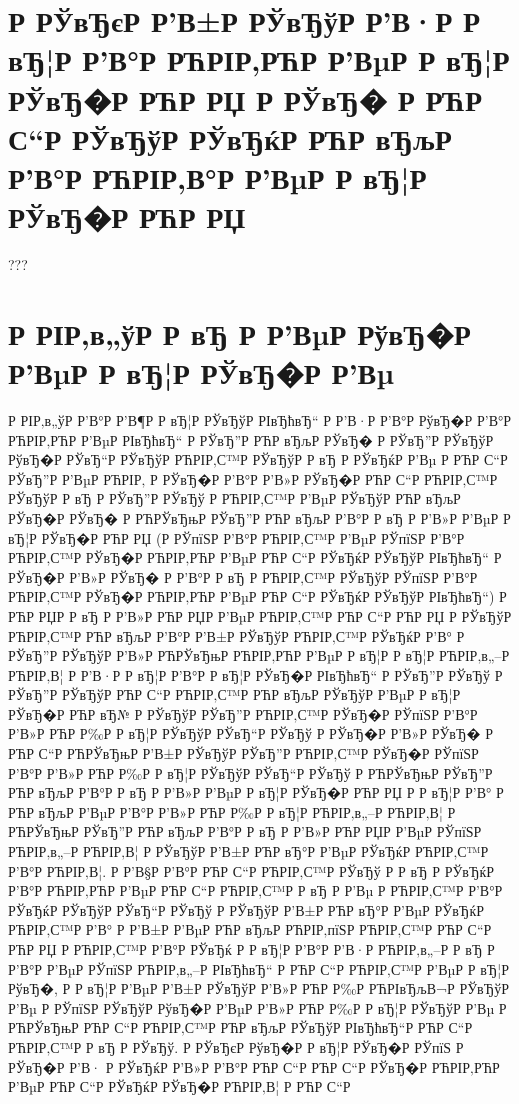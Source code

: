 \documentclass[a4paper,14pt]{extarticle}
\begin{document}
\newpage

\setcounter{page}{2}

\tableofcontents

\clearpage
\section{Р  РЎвЂєР  Р’В±Р  РЎвЂўР  Р’В·Р  Р вЂ¦Р  Р’В°Р РЋРІР‚РЋР  Р’ВµР  Р вЂ¦Р  РЎвЂ�Р РЋР РЏ Р  РЎвЂ� Р РЋР С“Р  РЎвЂўР  РЎвЂќР РЋР вЂљР  Р’В°Р РЋРІР‚В°Р  Р’ВµР  Р вЂ¦Р  РЎвЂ�Р РЋР РЏ}
	???
\clearpage

\section{Р  РІР‚в„ўР  Р вЂ Р  Р’ВµР  РўвЂ�Р  Р’ВµР  Р вЂ¦Р  РЎвЂ�Р  Р’Вµ}
Р  РІР‚в„ўР  Р’В°Р  Р’В¶Р  Р вЂ¦Р  РЎвЂўР  РІвЂћвЂ“ Р  Р’В·Р  Р’В°Р  РўвЂ�Р  Р’В°Р РЋРІР‚РЋР  Р’ВµР  РІвЂћвЂ“ Р  РЎвЂ”Р РЋР вЂљР  РЎвЂ� Р  РЎвЂ”Р  РЎвЂўР  РўвЂ�Р  РЎвЂ“Р  РЎвЂўР РЋРІР‚С™Р  РЎвЂўР  Р вЂ Р  РЎвЂќР  Р’Вµ Р РЋР С“Р  РЎвЂ”Р  Р’ВµР РЋРІР‚ Р  РЎвЂ�Р  Р’В°Р  Р’В»Р  РЎвЂ�Р РЋР С“Р РЋРІР‚С™Р  РЎвЂўР  Р вЂ  Р  РЎвЂ”Р  РЎвЂў Р РЋРІР‚С™Р  Р’ВµР  РЎвЂўР РЋР вЂљР  РЎвЂ�Р  РЎвЂ� Р РЋРЎвЂњР  РЎвЂ”Р РЋР вЂљР  Р’В°Р  Р вЂ Р  Р’В»Р  Р’ВµР  Р вЂ¦Р  РЎвЂ�Р РЋР РЏ (Р  РЎпїЅР  Р’В°Р РЋРІР‚С™Р  Р’ВµР  РЎпїЅР  Р’В°Р РЋРІР‚С™Р  РЎвЂ�Р РЋРІР‚РЋР  Р’ВµР РЋР С“Р  РЎвЂќР  РЎвЂўР  РІвЂћвЂ“ Р  РЎвЂ�Р  Р’В»Р  РЎвЂ� Р  Р’В°Р  Р вЂ Р РЋРІР‚С™Р  РЎвЂўР  РЎпїЅР  Р’В°Р РЋРІР‚С™Р  РЎвЂ�Р РЋРІР‚РЋР  Р’ВµР РЋР С“Р  РЎвЂќР  РЎвЂўР  РІвЂћвЂ“) Р РЋР РЏР  Р вЂ Р  Р’В»Р РЋР РЏР  Р’ВµР РЋРІР‚С™Р РЋР С“Р РЋР РЏ Р  РЎвЂўР РЋРІР‚С™Р РЋР вЂљР  Р’В°Р  Р’В±Р  РЎвЂўР РЋРІР‚С™Р  РЎвЂќР  Р’В° Р  РЎвЂ”Р  РЎвЂўР  Р’В»Р РЋРЎвЂњР РЋРІР‚РЋР  Р’ВµР  Р вЂ¦Р  Р вЂ¦Р РЋРІР‚в„–Р РЋРІР‚В¦ Р  Р’В·Р  Р вЂ¦Р  Р’В°Р  Р вЂ¦Р  РЎвЂ�Р  РІвЂћвЂ“ Р  РЎвЂ”Р  РЎвЂў Р  РЎвЂ”Р  РЎвЂўР РЋР С“Р РЋРІР‚С™Р РЋР вЂљР  РЎвЂўР  Р’ВµР  Р вЂ¦Р  РЎвЂ�Р РЋР вЂ№ Р  РЎвЂўР  РЎвЂ”Р РЋРІР‚С™Р  РЎвЂ�Р  РЎпїЅР  Р’В°Р  Р’В»Р РЋР Р‰Р  Р вЂ¦Р  РЎвЂўР  РЎвЂ“Р  РЎвЂў Р  РЎвЂ�Р  Р’В»Р  РЎвЂ� Р РЋР С“Р РЋРЎвЂњР  Р’В±Р  РЎвЂўР  РЎвЂ”Р РЋРІР‚С™Р  РЎвЂ�Р  РЎпїЅР  Р’В°Р  Р’В»Р РЋР Р‰Р  Р вЂ¦Р  РЎвЂўР  РЎвЂ“Р  РЎвЂў Р РЋРЎвЂњР  РЎвЂ”Р РЋР вЂљР  Р’В°Р  Р вЂ Р  Р’В»Р  Р’ВµР  Р вЂ¦Р  РЎвЂ�Р РЋР РЏ Р  Р вЂ¦Р  Р’В° Р РЋР вЂљР  Р’ВµР  Р’В°Р  Р’В»Р РЋР Р‰Р  Р вЂ¦Р РЋРІР‚в„–Р РЋРІР‚В¦ Р РЋРЎвЂњР  РЎвЂ”Р РЋР вЂљР  Р’В°Р  Р вЂ Р  Р’В»Р РЋР РЏР  Р’ВµР  РЎпїЅР РЋРІР‚в„–Р РЋРІР‚В¦ Р  РЎвЂўР  Р’В±Р РЋР вЂ°Р  Р’ВµР  РЎвЂќР РЋРІР‚С™Р  Р’В°Р РЋРІР‚В¦. Р  Р’В§Р  Р’В°Р РЋР С“Р РЋРІР‚С™Р  РЎвЂў Р  Р вЂ  Р  РЎвЂќР  Р’В°Р РЋРІР‚РЋР  Р’ВµР РЋР С“Р РЋРІР‚С™Р  Р вЂ Р  Р’Вµ Р РЋРІР‚С™Р  Р’В°Р  РЎвЂќР  РЎвЂўР  РЎвЂ“Р  РЎвЂў Р  РЎвЂўР  Р’В±Р РЋР вЂ°Р  Р’ВµР  РЎвЂќР РЋРІР‚С™Р  Р’В° Р  Р’В±Р  Р’ВµР РЋР вЂљР РЋРІР‚пїЅР РЋРІР‚С™Р РЋР С“Р РЋР РЏ Р РЋРІР‚С™Р  Р’В°Р  РЎвЂќ Р  Р вЂ¦Р  Р’В°Р  Р’В·Р РЋРІР‚в„–Р  Р вЂ Р  Р’В°Р  Р’ВµР  РЎпїЅР РЋРІР‚в„–Р  РІвЂћвЂ“ Р РЋР С“Р РЋРІР‚С™Р  Р’ВµР  Р вЂ¦Р  РўвЂ�, Р  Р вЂ¦Р  Р’ВµР  Р’В±Р  РЎвЂўР  Р’В»Р РЋР Р‰Р РЋРІвЂљВ¬Р  РЎвЂўР  Р’Вµ Р  РЎпїЅР  РЎвЂўР  РўвЂ�Р  Р’ВµР  Р’В»Р РЋР Р‰Р  Р вЂ¦Р  РЎвЂўР  Р’Вµ Р РЋРЎвЂњР РЋР С“Р РЋРІР‚С™Р РЋР вЂљР  РЎвЂўР  РІвЂћвЂ“Р РЋР С“Р РЋРІР‚С™Р  Р вЂ Р  РЎвЂў. Р  РЎвЂєР  РўвЂ�Р  Р вЂ¦Р  РЎвЂ�Р  РЎпїЅ Р  РЎвЂ�Р  Р’В· Р  РЎвЂќР  Р’В»Р  Р’В°Р РЋР С“Р РЋР С“Р  РЎвЂ�Р РЋРІР‚РЋР  Р’ВµР РЋР С“Р  РЎвЂќР  РЎвЂ�Р РЋРІР‚В¦ Р РЋР С“Р 
\end{document}

